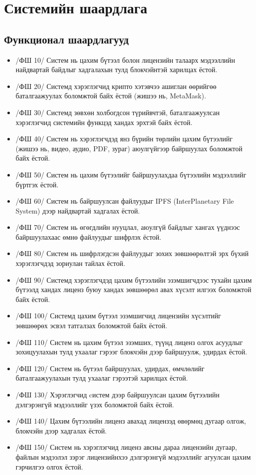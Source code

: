 \section{Системийн шаардлага}

\subsection{Функционал шаардлагууд}
\begin{itemize}
      \item[] /ФШ 10/ Систем нь цахим бүтээл болон лицензийн талаарх мэдээллийн найдвартай байдлыг хадгалахын тулд блокчэйнтэй харилцах ёстой.
      \item[] /ФШ 20/ Системд хэрэглэгчид крипто хэтэвчээ ашиглан өөрийгөө баталгаажуулах боломжтой байх ёстой (жишээ нь, MetaMask).
      \item[] /ФШ 30/ Системд зөвхөн холбогдсон түрийвчтэй, баталгаажуулсан хэрэглэгчид системийн функцэд хандах эрхтэй байх ёстой.
      \item[] /ФШ 40/ Систем нь хэрэглэгчдэд янз бүрийн төрлийн цахим бүтээлийг (жишээ нь, видео, аудио, PDF, зураг) аюулгүйгээр байршуулах боломжтой байх ёстой.
      \item[] /ФШ 50/ Систем нь цахим бүтээлийг байршуулахдаа бүтээлийн мэдээллийг бүртгэх ёстой.
      \item[] /ФШ 60/ Систем нь байршуулсан файлуудыг IPFS (InterPlanetary File System) дээр найдвартай хадгалах ёстой.
      \item[] /ФШ 70/ Систем нь өгөгдлийн нууцлал, аюулгүй байдлыг хангах үүднээс байршуулахаас өмнө файлуудыг шифрлэх ёстой.
      \item[] /ФШ 80/ Систем нь шифрлэгдсэн файлуудыг зохих зөвшөөрөлтэй эрх бүхий хэрэглэгчдэд зориулан тайлах ёстой.
      \item[] /ФШ 90/ Системд хэрэглэгчдэд цахим бүтээлийн эзэмшигчдээс тухайн цахим бүтээлд хандах лиценз буюу хандах зөвшөөрөл авах хүсэлт илгээх боломжтой байх ёстой.
      \item[] /ФШ 100/  Системд цахим бүтээл эзэмшигчид лицензийн хүсэлтийг зөвшөөрөх эсвэл татгалзах боломжтой байх ёстой.
      \item[] /ФШ 110/  Систем нь цахим бүтээл эзэмших, түүнд лиценз олгох асуудлыг зохицуулахын тулд ухаалаг гэрээг блокчэйн дээр байршуулж, удирдах ёстой.
      \item[] /ФШ 120/  Систем нь бүтээл байршуулах, удирдах, өмчлөлийг баталгаажуулахын тулд ухаалаг гэрээтэй харилцах ёстой.
      \item[] /ФШ 130/  Хэрэглэгчид cистем дээр байршуулсан цахим бүтээлийн дэлгэрэнгүй мэдээллийг үзэх боломжтой байх ёстой.
      \item[] /ФШ 140/  Цахим бүтээлийн лиценз авахад лицензэд өвөрмөц дугаар олгож, блокчэйн дээр хадгалах ёстой.
      \item[] /ФШ 150/  Систем нь хэрэглэгчид лиценз авсны дараа лицензийн дугаар, файлын мэдээлэл зэрэг лицензийнхээ дэлгэрэнгүй мэдээллийг агуулсан цахим гэрчилгээ олгох ёстой.
\end{itemize}

